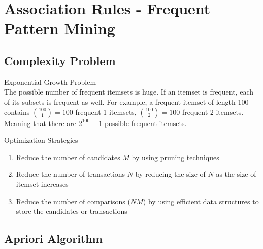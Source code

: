\section{Association Rules - Frequent Pattern Mining}

\subsection{Complexity Problem}

\begin{concept}{Exponential Growth Problem}\\
The possible number of frequent itemsets is huge. If an itemset is frequent, each of its subsets is frequent as well. For example, a frequent itemset of length 100 contains $\binom{100}{1} = 100$ frequent 1-itemsets, $\binom{100}{2} = 100$ frequent 2-itemsets. Meaning that there are $2^{100} - 1$ possible frequent itemsets.
\end{concept}

\begin{concept}{Optimization Strategies}
\begin{enumerate}
    \item Reduce the number of candidates $M$ by using pruning techniques
    \item Reduce the number of transactions $N$ by reducing the size of $N$ as the size of itemset increases
    \item Reduce the number of comparisons ($NM$) by using efficient data structures to store the candidates or transactions
\end{enumerate}
\end{concept}

\subsection{Apriori Algorithm}

